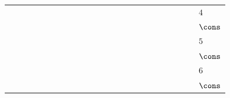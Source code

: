 {\begin{tabular}{ccccccccccccccccccccccc|l}
\gcell{$$} & \gcell{$\posC{\circ}$} & \gcell{$\posC{\circ}$} & \gcell{$\posC{\circ}$} & \gcell{$\posC{\circ}$} & \gcell{$\posC{\circ}$} & \gcell{$\posC{\circ}$} & \gcell{$$} & \gcell{$$} & \gcell{$$} & \gcell{$\posC{\circ}$} & \gcell{$\posC{\circ}$} & \gcell{$\posC{\circ}$} & \gcell{$\posD{\bullet}$} & \gcell{$\posC{\circ}$} & \gcell{$$} & \gcell{$$} & \gcell{$$} & \gcell{$$} & \gcell{$$} & \gcell{$$} & \gcell{$$} & \gcell{$$} & $4$ \\
\gcell{$$} & \gcell{$\posC{\circ}$} & \gcell{$\posC{\circ}$} & \gcell{$\posC{\circ}$} & \gcell{$\posC{\circ}$} & \gcell{$\posC{\circ}$} & \gcell{$\posC{\circ}$} & \gcell{$$} & \gcell{$$} & \gcell{$$} & \gcell{$\posC{\circ}$} & \gcell{$\posC{\circ}$} & \gcell{$\posC{\circ}$} & \gcell{$\posC{\circ}$} & \gcell{$\posC{\circ}$} & \gcell{$$} & \gcell{$$} & \gcell{$$} & \gcell{$$} & \gcell{$$} & \gcell{$$} & \gcell{$$} & \gcell{$$} & $\cons$ \\
\gcell{$$} & \gcell{$\posC{\circ}$} & \gcell{$\posC{\circ}$} & \gcell{$\posC{\circ}$} & \gcell{$\posC{\circ}$} & \gcell{$\posC{\circ}$} & \gcell{$\posC{\circ}$} & \gcell{$$} & \gcell{$$} & \gcell{$$} & \gcell{$\posC{\circ}$} & \gcell{$\posC{\circ}$} & \gcell{$\posC{\circ}$} & \gcell{$\posC{\circ}$} & \gcell{$\posC{\circ}$} & \gcell{$\posD{\bullet}$} & \gcell{$\posC{\circ}$} & \gcell{$$} & \gcell{$$} & \gcell{$$} & \gcell{$$} & \gcell{$$} & \gcell{$$} & $5$ \\
\gcell{$$} & \gcell{$\posC{\circ}$} & \gcell{$\posC{\circ}$} & \gcell{$\posC{\circ}$} & \gcell{$\posC{\circ}$} & \gcell{$\posC{\circ}$} & \gcell{$\posC{\circ}$} & \gcell{$$} & \gcell{$$} & \gcell{$$} & \gcell{$\posC{\circ}$} & \gcell{$\posC{\circ}$} & \gcell{$\posC{\circ}$} & \gcell{$\posC{\circ}$} & \gcell{$\posC{\circ}$} & \gcell{$\posC{\circ}$} & \gcell{$\posC{\circ}$} & \gcell{$$} & \gcell{$$} & \gcell{$$} & \gcell{$$} & \gcell{$$} & \gcell{$$} & $\cons$ \\
\gcell{$$} & \gcell{$\posC{\circ}$} & \gcell{$\posC{\circ}$} & \gcell{$\posC{\circ}$} & \gcell{$\posC{\circ}$} & \gcell{$\posC{\circ}$} & \gcell{$\posC{\circ}$} & \gcell{$$} & \gcell{$$} & \gcell{$$} & \gcell{$\posC{\circ}$} & \gcell{$\posC{\circ}$} & \gcell{$\posC{\circ}$} & \gcell{$\posC{\circ}$} & \gcell{$\posC{\circ}$} & \gcell{$\posC{\circ}$} & \gcell{$\posC{\circ}$} & \gcell{$\posD{\bullet}$} & \gcell{$\posC{\circ}$} & \gcell{$$} & \gcell{$$} & \gcell{$$} & \gcell{$$} & $6$ \\
\gcell{$$} & \gcell{$\posC{\circ}$} & \gcell{$\posC{\circ}$} & \gcell{$\posC{\circ}$} & \gcell{$\posC{\circ}$} & \gcell{$\posC{\circ}$} & \gcell{$\posC{\circ}$} & \gcell{$$} & \gcell{$$} & \gcell{$$} & \gcell{$\posC{\circ}$} & \gcell{$\posC{\circ}$} & \gcell{$\posC{\circ}$} & \gcell{$\posC{\circ}$} & \gcell{$\posC{\circ}$} & \gcell{$\posC{\circ}$} & \gcell{$\posC{\circ}$} & \gcell{$\posC{\circ}$} & \gcell{$\posC{\circ}$} & \gcell{$$} & \gcell{$$} & \gcell{$$} & \gcell{$$} & $\cons$ \\

\end{tabular}}

